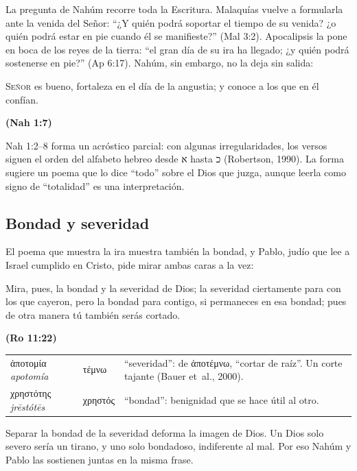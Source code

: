 \documentclass[11pt,letterpaper]{article}
\newcommand{\heb}[1]{\mbox{\foreignlanguage{hebrew}{#1}}}
\newcommand{\grc}[1]{\foreignlanguage{ancientgreek}{#1}}
\newcommand{\SENOR}{\textsc{Señor}}
\newcommand{\fuente}[1]{\par\hfill{\upshape\bfseries\small\textcolor{azul}{#1}}}
\begin{document}
La pregunta de Nahúm recorre toda la Escritura. Malaquías vuelve a formularla ante la venida del Señor: ``¿Y quién podrá soportar el tiempo de su venida? ¿o quién podrá estar en pie cuando él se manifieste?'' (Mal 3:2). Apocalipsis la pone en boca de los reyes de la tierra: ``el gran día de su ira ha llegado; ¿y quién podrá sostenerse en pie?'' (Ap 6:17). Nahúm, sin embargo, no la deja sin salida:

\begin{cita}\SENOR{} es bueno, fortaleza en el día de la angustia; y conoce a los que en él confían.\fuente{(Nah 1:7)}\end{cita}

\begin{nota}[Precisión]
Nah 1:2--8 forma un acróstico parcial: con algunas irregularidades, los versos siguen el orden del alfabeto hebreo desde \heb{א} hasta \heb{כ} (Robertson, 1990). La forma sugiere un poema que lo dice ``todo'' sobre el Dios que juzga, aunque leerla como signo de ``totalidad'' es una interpretación.
\end{nota}

\subsection{Bondad y severidad}
El poema que muestra la ira muestra también la bondad, y Pablo, judío que lee a Israel cumplido en Cristo, pide mirar ambas caras a la vez:

\begin{cita}Mira, pues, la bondad y la severidad de Dios; la severidad ciertamente para con los que cayeron, pero la bondad para contigo, si permaneces en esa bondad; pues de otra manera tú también serás cortado.\fuente{(Ro 11:22)}\end{cita}

\begin{filologia}[Ro 11:22]
\begin{tabular}{@{}L{3.2cm}L{1.6cm}L{10cm}@{}}
\grc{ἀποτομία} \emph{apotomía} & \grc{τέμνω} & ``severidad'': de \grc{ἀποτέμνω}, ``cortar de raíz''. Un corte tajante (Bauer et~al., 2000). \\[2pt]
\grc{χρηστότης} \emph{jrēstótēs} & \grc{χρηστός} & ``bondad'': benignidad que se hace útil al otro. \\
\end{tabular}
\end{filologia}

Separar la bondad de la severidad deforma la imagen de Dios. Un Dios solo severo sería un tirano, y uno solo bondadoso, indiferente al mal. Por eso Nahúm y Pablo las sostienen juntas en la misma frase.
\end{document}
